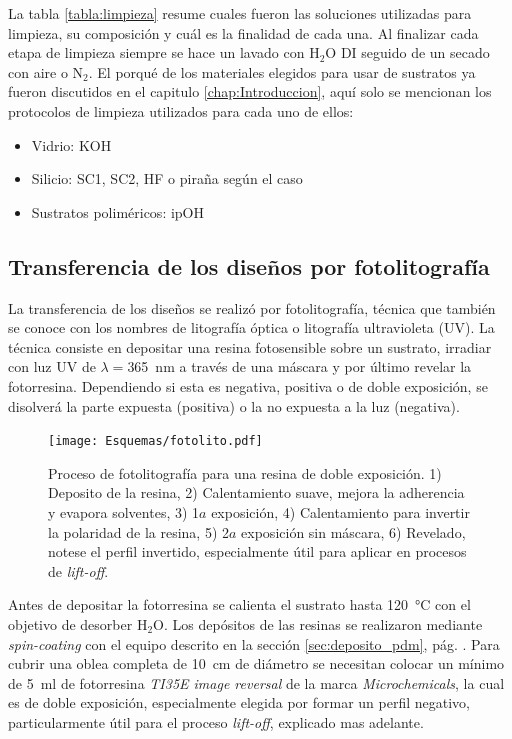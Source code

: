 							
			La tabla \ref{tabla:limpieza} resume cuales fueron las soluciones utilizadas para limpieza, su composición y cuál es la finalidad de cada una. Al finalizar cada etapa de limpieza siempre se hace un lavado con H$_2$O DI seguido de un secado con aire o N$_2$. El porqué de los materiales elegidos para usar de sustratos ya fueron discutidos en el capitulo \ref{chap:Introduccion}, aquí solo se mencionan los protocolos de limpieza\cite{Franssila2004,Kern1990} utilizados para cada uno de ellos:

				\begin{itemize}
					\item{Vidrio: KOH}
					\item{Silicio: SC1, SC2, HF o piraña según el caso}
					\item{Sustratos poliméricos: ipOH}
				\end{itemize}

    \subsection{Transferencia de los diseños por fotolitografía}\label{sec:fotolito}

		La transferencia de los diseños se realizó por fotolitografía, técnica que también se conoce con los nombres de litografía óptica o litografía ultravioleta (UV). La técnica consiste en depositar una resina fotosensible sobre un sustrato, irradiar con luz UV de $\lambda\!=$\SI{365}{nm} a través de una máscara y por último revelar la fotorresina. Dependiendo si esta es negativa, positiva o de doble exposición, se disolverá la parte expuesta (positiva) o la no expuesta a la luz (negativa). \cite{Jaeger2001,Franssila2004,Mack2007,Mack2006}
				

			  \begin{figure}[b!]
			  \begin{center}
			  \texttt{[image: Esquemas/fotolito.pdf]}
			  \caption[Esquema fotolitografía]{Proceso de fotolitografía para una resina de doble exposición. 1) Deposito de la resina, 2) Calentamiento suave, mejora la adherencia y evapora solventes, 3) 1$a$ exposición, 4) Calentamiento para invertir la polaridad de la resina, 5) 2$a$ exposición sin máscara, 6) Revelado, notese el perfil invertido, especialmente útil para aplicar en procesos de\textit{ lift-off}.}
			  \label{esq:fotolito}
			  \end{center}
			  \end{figure}	

		Antes de depositar la fotorresina se calienta el sustrato hasta \SI{120}{\celsius} con el objetivo de desorber H$_2$O. Los depósitos de las resinas se realizaron mediante \textit{spin-coating} con el equipo descrito en la sección \ref{sec:deposito_pdm}, pág. \pageref{sec:deposito_pdm}. Para cubrir una oblea completa de \SI{10}{\cm} de diámetro se necesitan colocar un mínimo de \SI{5}{\ml} de fotorresina \textit{TI35E image reversal} de la marca \textit{Microchemicals}, la cual es de doble exposición, especialmente elegida por formar un perfil negativo, particularmente útil para el proceso \textit{lift-off}, explicado mas adelante.\cite{MicrochemicalsTeam2009} 
	
